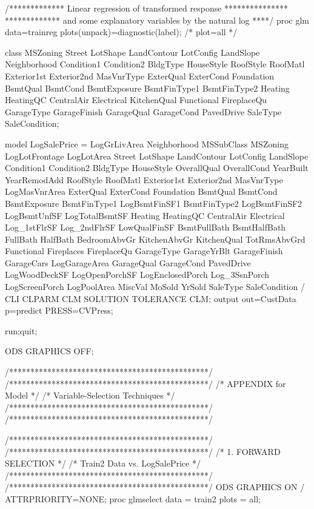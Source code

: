 /************* Linear regression of transformed response ***************
 ************* and some explanatory variables by the natural log  ****/ 
proc glm data=trainreg plots(unpack)=diagnostic(label);  /* plot=all */  

class MSZoning Street LotShape LandContour LotConfig LandSlope Neighborhood 
Condition1 Condition2 BldgType HouseStyle RoofStyle RoofMatl Exterior1st Exterior2nd 
MasVnrType ExterQual ExterCond Foundation BsmtQual BsmtCond BsmtExposure BsmtFinType1 
BsmtFinType2 Heating HeatingQC CentralAir Electrical KitchenQual Functional FireplaceQu 
GarageType GarageFinish GarageQual GarageCond PavedDrive
SaleType SaleCondition; 

model LogSalePrice = LogGrLivArea Neighborhood MSSubClass MSZoning LogLotFrontage LogLotArea 
Street LotShape LandContour LotConfig LandSlope Condition1 Condition2 BldgType HouseStyle 
OverallQual OverallCond YearBuilt YearRemodAdd RoofStyle RoofMatl Exterior1st Exterior2nd 
MasVnrType LogMasVnrArea ExterQual ExterCond Foundation BsmtQual BsmtCond BsmtExposure 
BsmtFinType1 LogBsmtFinSF1 BsmtFinType2 LogBsmtFinSF2 LogBsmtUnfSF LogTotalBsmtSF Heating 
HeatingQC CentralAir Electrical Log_1stFlrSF Log_2ndFlrSF LowQualFinSF BsmtFullBath BsmtHalfBath 
FullBath HalfBath BedroomAbvGr KitchenAbvGr KitchenQual TotRmsAbvGrd 
Functional Fireplaces FireplaceQu GarageType GarageYrBlt GarageFinish GarageCars LogGarageArea 
GarageQual GarageCond PavedDrive LogWoodDeckSF LogOpenPorchSF LogEnclosedPorch Log_3SsnPorch 
LogScreenPorch LogPoolArea MiscVal MoSold YrSold SaleType SaleCondition / CLI CLPARM CLM SOLUTION TOLERANCE CLM;
output out=CustData p=predict PRESS=CVPress;

run;quit;

ODS GRAPHICS OFF; 

/***********************************************/
/***********************************************/
/*           APPENDIX for Model                */ 
/*      Variable-Selection Techniques          */
/***********************************************/
/***********************************************/

/***********************************************/
/***********************************************/
/*             1. FORWARD SELECTION            */
/*         Train2 Data vs. LogSalePrice        */
/***********************************************/
/***********************************************/
ODS GRAPHICS ON / ATTRPRIORITY=NONE; 
proc glmselect data = train2 plots = all;  

